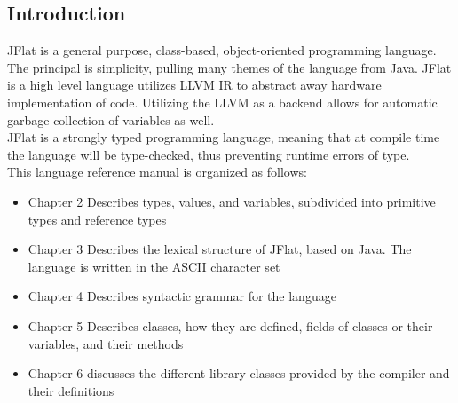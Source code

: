 \begin{homeworkProblem}
	\chapter{Introduction}
	JFlat is a general purpose, class-based, object-oriented programming language. The principal is simplicity, pulling many themes of the language from Java. JFlat is a high level language utilizes LLVM IR to abstract away hardware implementation of code. Utilizing the LLVM as a backend allows for automatic garbage collection of variables as well. \\
	JFlat is a strongly typed programming language, meaning that at compile time the language will be type-checked, thus preventing runtime errors of type. \\
	This language reference manual is organized as follows:\\
	\begin{itemize}
		\item Chapter 2 Describes types, values, and variables, subdivided into primitive types and reference types
		\item Chapter 3 Describes the lexical structure of JFlat, based on Java. The language is written in the ASCII character set
		\item Chapter 4 Describes syntactic grammar for the language
		\item Chapter 5 Describes classes, how they are defined, fields of classes or their variables, and their methods
		\item Chapter 6 discusses the different library classes provided by the compiler and their definitions
	\end{itemize}
\end{homeworkProblem}